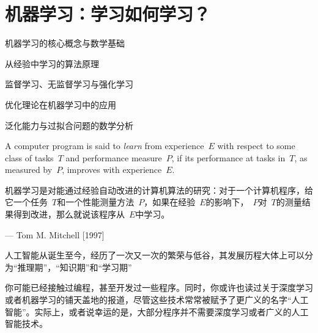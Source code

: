 
\chapter{机器学习：学习如何学习？}\label{ch:机器学习}
 \begin{introduction}
  \item 机器学习的核心概念与数学基础
  \item 从经验中学习的算法原理
  \item 监督学习、无监督学习与强化学习
  \item 优化理论在机器学习中的应用
  \item 泛化能力与过拟合问题的数学分析
\end{introduction}

A computer program is said to {\em learn} from experience~$ E$ with respect to some class of tasks~$T$ and performance measure~$P$, if its performance at tasks in~$T$, as measured by~$P$, improves with experience~$E$.

机器学习是对能通过经验自动改进的计算机算法的研究：对于一个计算机程序，给它一个任务~$T$和一个性能测量方法~$P$，如果在经验~$E$的影响下，~$P$对~$T$的测量结果得到改进，那么就说该程序从~$E$中学习。
\begin{flushright}
— Tom M. Mitchell  [1997]
\end{flushright}

人工智能从诞生至今，经历了一次又一次的繁荣与低谷，其发展历程大体上可以分为“推理期”，“知识期”和“学习期”%
%
%

你可能已经接触过编程，甚至开发过一些程序。同时，你或许也读过关于深度学习或者机器学习的铺天盖地的报道，尽管这些技术常常被赋予了更广义的名字“人工智能”。实际上，或者说幸运的是，大部分程序并不需要深度学习或者广义的人工智能技术。

